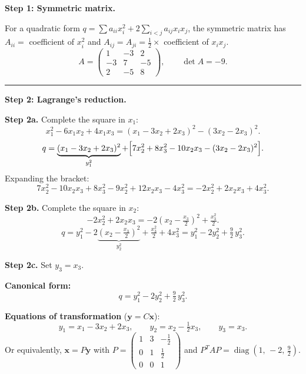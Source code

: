 \documentclass[12pt,a3paper]{article}
\begin{document}
\begin{tcolorbox}[enhanced,breakable,
  colback=cE!4,colframe=cE,boxrule=0.8pt,arc=5pt,
  title={\textbf{Answer --- Symmetric Matrix, $P^TAP=D$, Classification \&
    Geometry of $q = x^2+7y^2+8z^2-6xy+4xz-10yz$}},
  fonttitle=\bfseries\color{white},colbacktitle=cE]

\textbf{Step 1: Symmetric matrix.}

For a quadratic form $q = \sum a_{ii}x_i^2 + 2\sum_{i<j}a_{ij}x_ix_j$,
the symmetric matrix has $A_{ii} = $ coefficient of $x_i^2$ and
$A_{ij} = A_{ji} = \tfrac{1}{2} \times$ coefficient of $x_ix_j$.
\[
  A = \begin{pmatrix}1&-3&2\\-3&7&-5\\2&-5&8\end{pmatrix}, \qquad \det A = -9.
\]

\medskip\textcolor{cE}{\rule{\textwidth}{0.4pt}}

\textbf{Step 2: Lagrange's reduction.}

\textbf{Step 2a.} Complete the square in $x_1$:
\[
  x_1^2 - 6x_1 x_2 + 4x_1 x_3
  = (x_1 - 3x_2 + 2x_3)^2 - (3x_2-2x_3)^2.
\]
\[
  q = \underbrace{(x_1-3x_2+2x_3)^2}_{y_1^2}
    + \Bigl[7x_2^2+8x_3^2-10x_2 x_3 - (3x_2-2x_3)^2\Bigr].
\]
Expanding the bracket:
\[
  7x_2^2-10x_2 x_3+8x_3^2-9x_2^2+12x_2 x_3-4x_3^2
  = -2x_2^2+2x_2 x_3+4x_3^2.
\]

\textbf{Step 2b.} Complete the square in $x_2$:
\[
  -2x_2^2 + 2x_2 x_3
  = -2\!\left(x_2 - \tfrac{x_3}{2}\right)^{\!2} + \tfrac{x_3^2}{2}.
\]
\[
  q = y_1^2 - 2\underbrace{\!\left(x_2-\tfrac{x_3}{2}\right)^{\!2}}_{y_2^2}
    + \tfrac{x_3^2}{2} + 4x_3^2
  = y_1^2 - 2y_2^2 + \tfrac{9}{2}\,y_3^2.
\]

\textbf{Step 2c.} Set $y_3 = x_3$.

\textbf{Canonical form:}
\[
  \boxed{q = y_1^2 - 2y_2^2 + \tfrac{9}{2}\,y_3^2.}
\]

\textbf{Equations of transformation} ($\mathbf{y} = C\mathbf{x}$):
\[
  y_1 = x_1 - 3x_2 + 2x_3, \qquad
  y_2 = x_2 - \tfrac{1}{2}x_3, \qquad
  y_3 = x_3.
\]
Or equivalently, $\mathbf{x} = P\mathbf{y}$ with
$P = \begin{pmatrix}1&3&-\frac{1}{2}\\0&1&\frac{1}{2}\\0&0&1\end{pmatrix}$
and $P^T A P = \operatorname{diag}\!\left(1,\,-2,\,\tfrac{9}{2}\right)$.


\end{tcolorbox}
\end{document}
